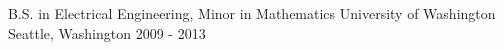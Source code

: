 

\begin{cventries}

  \cventry
    {B.S. in Electrical Engineering, Minor in Mathematics} %
    {University of Washington} %
    {Seattle, Washington} %
    {2009 - 2013} %
    { }
    
    \vspace*{-12pt} 

\end{cventries}
